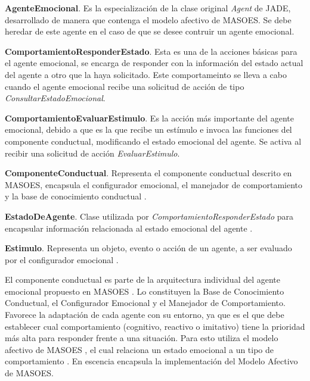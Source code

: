 \textbf{AgenteEmocional}. Es la especialización de
la clase original \textit{Agent} de JADE, desarrollado de manera que contenga
el modelo afectivo de MASOES.
Se debe heredar de este agente en el caso de que se desee contruir un agente emocional.

\textbf{ComportamientoResponderEstado}. Esta es
una de la acciones básicas para el agente emocional, se encarga
de responder con la información del estado actual del agente a otro que
la haya solicitado. Este comportameinto se lleva a cabo cuando el
agente emocional recibe una solicitud de acción de tipo \textit{ConsultarEstadoEmocional}.

\textbf{ComportamientoEvaluarEstimulo}. Es la acción más
importante del agente emocional, debido a que es la que recibe un estímulo e
invoca las funciones del componente conductual, modificando el estado emocional
del agente. Se activa al recibir una solicitud de acción \textit{EvaluarEstimulo}.

\textbf{ComponenteConductual}. Representa el componente conductual
descrito en MASOES, encapsula el configurador emocional, el manejador de
comportamiento y la base de conocimiento conductual .

\textbf{EstadoDeAgente}. Clase utilizada por
\textit{ComportamientoResponderEstado} para encapsular información relacionada
al estado emocional del agente .

\textbf{Estimulo}. Representa un objeto, evento
o acción de un agente, a ser evaluado por el configurador emocional .


\label{componente-conductual}

El componente conductual es parte de la arquitectura individual del agente emocional propuesto en MASOES
.
Lo constituyen la Base de Conocimiento Conductual, el Configurador Emocional y
el Manejador de Comportamiento. Favorece la adaptación de cada agente con su
entorno, ya que es el que debe establecer cual comportamiento (cognitivo, reactivo o
imitativo) tiene la prioridad más alta para responder frente a una situación.
Para esto utiliza el modelo afectivo de MASOES
, el cual relaciona un estado emocional a un
tipo de comportamiento .
En escencia encapsula la implementación del Modelo Afectivo de MASOES.

